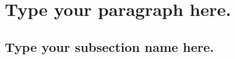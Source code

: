 \documentclass[a4paper, 12pt, titlepage, legno]{article}
\begin{document}
\tableofcontents

\newpage\section{Type your paragraph here.}
\subsection{Type your subsection name here.}
\end{document}

